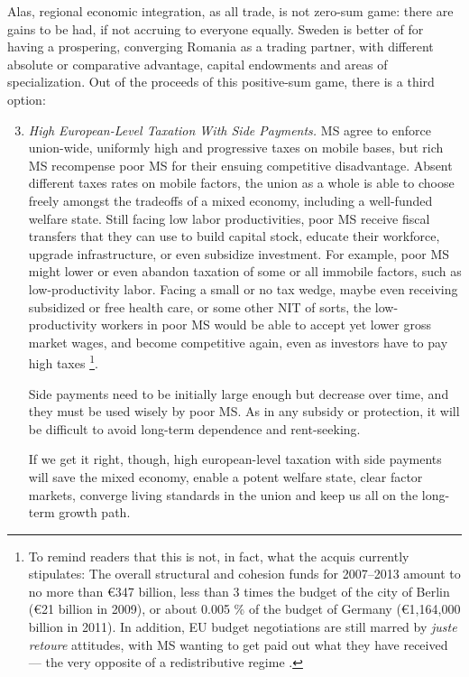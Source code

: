 \documentclass[11pt,a4paper,oneside]{article}
\begin{document}
Alas, regional economic integration, as all trade, is not zero-sum game:
there are gains to be had, if not accruing to everyone equally.
Sweden is better of for having a prospering, converging Romania as a trading partner, with different absolute or comparative advantage, capital endowments and areas of specialization.
Out of the proceeds of this positive-sum game, there is a third option:
\begin{enumerate}
	\setcounter{enumi}{2}
	\item \emph{High European-Level Taxation With Side Payments.} \gls{MS} agree to enforce union-wide, uniformly high and progressive taxes on mobile bases, but rich \gls{MS} recompense poor \gls{MS} for their ensuing competitive disadvantage.
	Absent different taxes rates on mobile factors, the union as a whole is able to choose freely amongst the tradeoffs of a mixed economy, including a well-funded welfare state.
	Still facing low labor productivities, poor \gls{MS} receive fiscal transfers that they can use to build capital stock, educate their workforce, upgrade infrastructure, or even subsidize investment.
	For example, poor \gls{MS} might lower or even abandon taxation of some or all immobile factors, such as low-productivity labor.
	Facing a small or no tax wedge, maybe even receiving subsidized or free health care, or some other \gls{NIT} of sorts, the low-productivity workers in poor \gls{MS} would be able to accept yet lower gross market wages, and become competitive again, even as investors have to pay high taxes
	\footnote{
		To remind readers that this is not, in fact, what the acquis currently stipulates:
		The overall structural and cohesion funds for 2007--2013 amount to no more than \euro 347 billion, less than 3 times the budget of the city of Berlin (\euro 21 billion in 2009), or about 0.005 \% of the budget of Germany (\euro 1,164,000 billion in 2011).
		In addition, \gls{EU} budget negotiations are still marred by \emph{juste retoure} attitudes, with \gls{MS} wanting to get paid out what they have received --- the very opposite of a redistributive regime \citep[e.g.][]{Begg2008a}.
	}.

	Side payments need to be initially large enough but decrease over time, and they must be used wisely by poor \gls{MS}.
	As in any subsidy or  protection, it will be difficult to avoid long-term dependence and rent-seeking.

	If we get it right, though, high european-level taxation with side payments will save the mixed economy, enable a potent welfare state, clear factor markets, converge living standards in the union and keep us all on the long-term growth path.
\end{enumerate}
\end{document}
